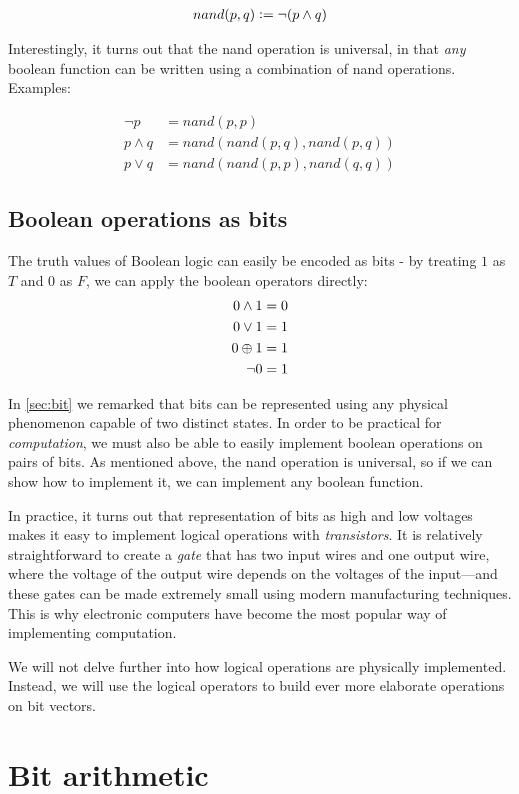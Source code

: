 \begin{align}
  nand(p,q) \vcentcolon= \neg (p \land q)
\end{align}

Interestingly, it turns out that the nand operation is universal, in
that \emph{any} boolean function can be written using a combination of
nand operations.  Examples:

\begin{align}
  \neg p &= nand(p,p) \\
  p \land q &= nand(nand(p,q),nand(p,q)) \\
  p \lor q &= nand(nand(p,p),nand(q,q))
\end{align}

\subsection{Boolean operations as bits}

The truth values of Boolean logic can easily be encoded as bits - by
treating $1$ as $T$ and $0$ as $F$, we can apply the boolean operators
directly:
\begin{align}
  0 \land 1 &= 0 \\
  0 \lor 1 &= 1 \\
  0 \oplus 1 &= 1 \\
  \neg 0 &= 1
\end{align}

In \cref{sec:bit} we remarked that bits can be represented using any
physical phenomenon capable of two distinct states.  In order to be
practical for \emph{computation}, we must also be able to easily
implement boolean operations on pairs of bits.  As mentioned above,
the nand operation is universal, so if we can show how to implement
it, we can implement any boolean function.

In practice, it turns out that representation of bits as high and low
voltages makes it easy to implement logical operations with
\emph{transistors}.  It is relatively straightforward to create a
\emph{gate} that has two input wires and one output wire, where the
voltage of the output wire depends on the voltages of the input---and
these gates can be made extremely small using modern manufacturing
techniques.  This is why electronic computers have become the most
popular way of implementing computation.

We will not delve further into how logical operations are physically
implemented.  Instead, we will use the logical operators to build ever
more elaborate operations on bit vectors.

\section{Bit arithmetic}
\label{sec:bit-arithmetic}

